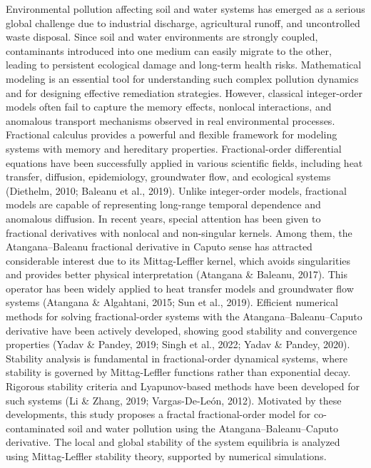\documentclass[10pt]{NSP1}
\begin{document}
Environmental pollution affecting soil and water systems has emerged as a serious global challenge due to industrial discharge, agricultural runoff, and uncontrolled waste disposal. Since soil and water environments are strongly coupled, contaminants introduced into one medium can easily migrate to the other, leading to persistent ecological damage and long-term health risks. Mathematical modeling is an essential tool for understanding such complex pollution dynamics and for designing effective remediation strategies. However, classical integer-order models often fail to capture the memory effects, nonlocal interactions, and anomalous transport mechanisms observed in real environmental processes. Fractional calculus provides a powerful and flexible framework for modeling systems with memory and hereditary properties. Fractional-order differential equations have been successfully applied in various scientific fields, including heat transfer, diffusion, epidemiology, groundwater flow, and ecological systems (Diethelm, 2010; Baleanu et al., 2019). Unlike integer-order models, fractional models are capable of representing long-range temporal dependence and anomalous diffusion. In recent years, special attention has been given to fractional derivatives with nonlocal and non-singular kernels. Among them, the Atangana–Baleanu fractional derivative in Caputo sense has attracted considerable interest due to its Mittag-Leffler kernel, which avoids singularities and provides better physical interpretation (Atangana \& Baleanu, 2017). This operator has been widely applied to heat transfer models and groundwater flow systems (Atangana \& Algahtani, 2015; Sun et al., 2019). Efficient numerical methods for solving fractional-order systems with the Atangana–Baleanu–Caputo derivative have been actively developed, showing good stability and convergence properties (Yadav \& Pandey, 2019; Singh et al., 2022; Yadav \& Pandey, 2020). Stability analysis is fundamental in fractional-order dynamical systems, where stability is governed by Mittag-Leffler functions rather than exponential decay. Rigorous stability criteria and Lyapunov-based methods have been developed for such systems (Li \& Zhang, 2019; Vargas-De-León, 2012). Motivated by these developments, this study proposes a fractal fractional-order model for co-contaminated soil and water pollution using the Atangana–Baleanu–Caputo derivative. The local and global stability of the system equilibria is analyzed using Mittag-Leffler stability theory, supported by numerical simulations.
\end{document}
